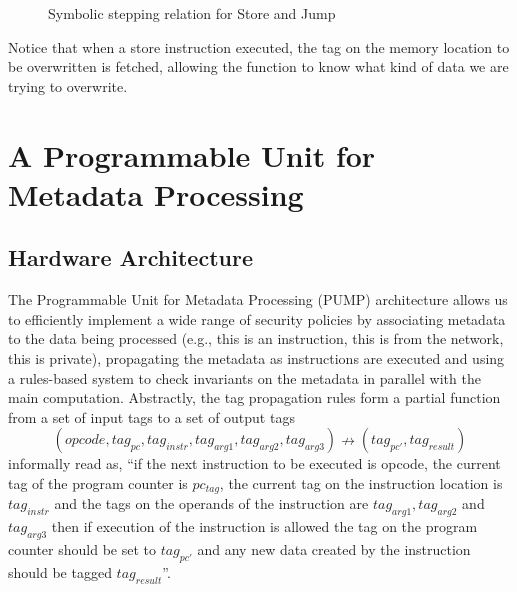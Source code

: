 \begin{figure}[!htpb]
\bigskip

\caption{Symbolic stepping relation for Store and Jump}
\end{figure}

Notice that when a store instruction executed, the tag on the memory location to
be overwritten is fetched, allowing the \TRANSFER function to know what kind of
data we are trying to overwrite.

\section{A Programmable Unit for Metadata Processing}\label{sec:pump}


\subsection{Hardware Architecture}

The Programmable Unit for Metadata Processing (PUMP) architecture
\cite{pump_hasp2014}
allows us to efficiently implement a wide range of security policies 
\cite{pump_ccs2014} by associating metadata to the data being processed 
(e.g., this is an instruction, this is from the network, this is private),
propagating the metadata as instructions are executed and using a rules-based 
system to check invariants on the metadata in parallel with the main computation.
Abstractly, the tag propagation rules form a partial function from a set of 
input tags to a set of output tags
$$(opcode, tag_{pc},tag_{instr}, tag_{arg1}, tag_{arg2}, tag_{arg3})
\nrightarrow (tag_{pc'},tag_{result})$$
informally read as, ``if the next instruction to be executed is opcode, the 
current tag of the program counter is $pc_{tag}$, the current tag on the 
instruction location is $tag_{instr}$ and the tags on the operands of the 
instruction are $tag_{arg1}, tag_{arg2}$ and $tag_{arg3}$ then if execution of 
the instruction is allowed the tag on the program counter should be set
to $tag_{pc'}$ and any new data created by the instruction should be tagged 
$tag_{result}$''.

